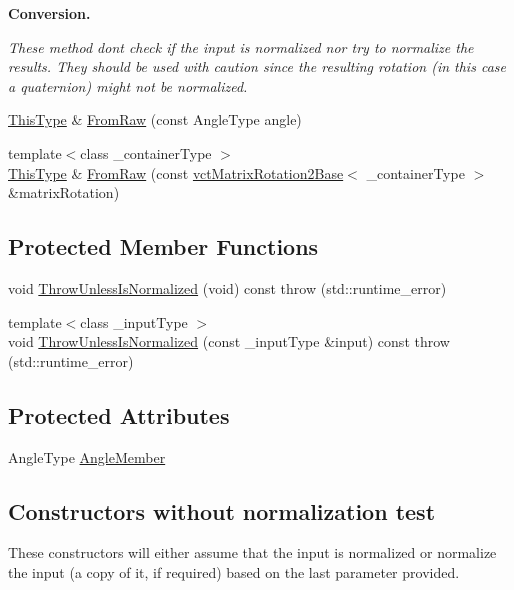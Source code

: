 \begin{Indent}{\bf Conversion.}\par
{\em These method don\textquotesingle{}t check if the input is normalized nor try to normalize the results. They should be used with caution since the resulting rotation (in this case a quaternion) might not be normalized. }\begin{DoxyCompactItemize}
\item 
\hyperlink{classvct_angle_rotation2_a67339254f084f89c13aca70c1242d18e}{This\+Type} \& \hyperlink{classvct_angle_rotation2_ac3c54c73f9da662e9d0c28b5d14a81e1}{From\+Raw} (const Angle\+Type angle)
\item 
{\footnotesize template$<$class \+\_\+container\+Type $>$ }\\\hyperlink{classvct_angle_rotation2_a67339254f084f89c13aca70c1242d18e}{This\+Type} \& \hyperlink{classvct_angle_rotation2_a2eac56d4cbadfd017b3621cca6a712b8}{From\+Raw} (const \hyperlink{classvct_matrix_rotation2_base}{vct\+Matrix\+Rotation2\+Base}$<$ \+\_\+container\+Type $>$ \&matrix\+Rotation)
\end{DoxyCompactItemize}
\end{Indent}
\subsection*{Protected Member Functions}
\begin{DoxyCompactItemize}
\item 
void \hyperlink{classvct_angle_rotation2_a9d7fe4da5fe8b80abf3995ec62ac23b7}{Throw\+Unless\+Is\+Normalized} (void) const   throw (std\+::runtime\+\_\+error)
\item 
{\footnotesize template$<$class \+\_\+input\+Type $>$ }\\void \hyperlink{classvct_angle_rotation2_a47d2f2786cca424f8b4b0daf99c6e907}{Throw\+Unless\+Is\+Normalized} (const \+\_\+input\+Type \&input) const   throw (std\+::runtime\+\_\+error)
\end{DoxyCompactItemize}
\subsection*{Protected Attributes}
\begin{DoxyCompactItemize}
\item 
Angle\+Type \hyperlink{classvct_angle_rotation2_a400d22472af231f8a133eea69446ea7a}{Angle\+Member}
\end{DoxyCompactItemize}
\subsection*{Constructors without normalization test}
\label{_amgrp6d350e6340f2c7ccfd481cf2f898de43}%
These constructors will either assume that the input is normalized or normalize the input (a copy of it, if required) based on the last parameter provided.


